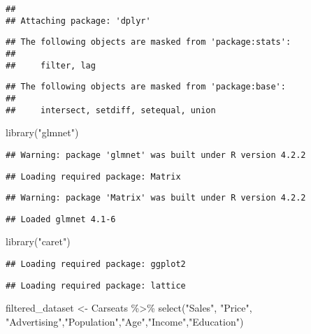 \documentclass[
]{article}
\newenvironment{Shaded}{\begin{snugshade}}{\end{snugshade}}
\newcommand{\FunctionTok}[1]{\textcolor[rgb]{0.00,0.00,0.00}{#1}}
\newcommand{\NormalTok}[1]{#1}
\newcommand{\OtherTok}[1]{\textcolor[rgb]{0.56,0.35,0.01}{#1}}
\newcommand{\SpecialCharTok}[1]{\textcolor[rgb]{0.00,0.00,0.00}{#1}}
\newcommand{\StringTok}[1]{\textcolor[rgb]{0.31,0.60,0.02}{#1}}
\begin{document}
\begin{verbatim}
## 
## Attaching package: 'dplyr'
\end{verbatim}

\begin{verbatim}
## The following objects are masked from 'package:stats':
## 
##     filter, lag
\end{verbatim}

\begin{verbatim}
## The following objects are masked from 'package:base':
## 
##     intersect, setdiff, setequal, union
\end{verbatim}

\begin{Shaded}
\begin{Highlighting}[]
\FunctionTok{library}\NormalTok{(}\StringTok{"glmnet"}\NormalTok{)}
\end{Highlighting}
\end{Shaded}

\begin{verbatim}
## Warning: package 'glmnet' was built under R version 4.2.2
\end{verbatim}

\begin{verbatim}
## Loading required package: Matrix
\end{verbatim}

\begin{verbatim}
## Warning: package 'Matrix' was built under R version 4.2.2
\end{verbatim}

\begin{verbatim}
## Loaded glmnet 4.1-6
\end{verbatim}

\begin{Shaded}
\begin{Highlighting}[]
\FunctionTok{library}\NormalTok{(}\StringTok{"caret"}\NormalTok{)}
\end{Highlighting}
\end{Shaded}

\begin{verbatim}
## Loading required package: ggplot2
\end{verbatim}

\begin{verbatim}
## Loading required package: lattice
\end{verbatim}

\begin{Shaded}
\begin{Highlighting}[]
\NormalTok{filtered\_dataset }\OtherTok{\textless{}{-}}\NormalTok{ Carseats }\SpecialCharTok{\%\textgreater{}\%} \FunctionTok{select}\NormalTok{(}\StringTok{"Sales"}\NormalTok{, }\StringTok{"Price"}\NormalTok{, }
\StringTok{"Advertising"}\NormalTok{,}\StringTok{"Population"}\NormalTok{,}\StringTok{"Age"}\NormalTok{,}\StringTok{"Income"}\NormalTok{,}\StringTok{"Education"}\NormalTok{) }
\end{Highlighting}
\end{Shaded}
\end{document}
